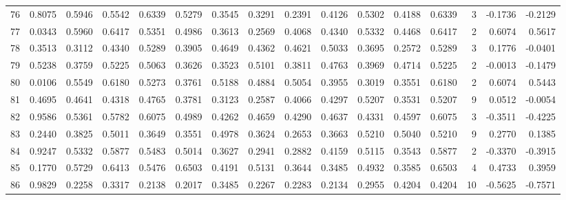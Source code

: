 \begin{tabular}{lrrrrrrrrrrrrrrr}
76  &      0.8075 &  0.5946 &  0.5542 &  0.6339 &  0.5279 &  0.3545 &  0.3291 &  0.2391 &  0.4126 &  0.5302 &   0.4188 &     0.6339 &      3 &                   -0.1736 &                    -0.2129 \\
77  &      0.0343 &  0.5960 &  0.6417 &  0.5351 &  0.4986 &  0.3613 &  0.2569 &  0.4068 &  0.4340 &  0.5332 &   0.4468 &     0.6417 &      2 &                    0.6074 &                     0.5617 \\
78  &      0.3513 &  0.3112 &  0.4340 &  0.5289 &  0.3905 &  0.4649 &  0.4362 &  0.4621 &  0.5033 &  0.3695 &   0.2572 &     0.5289 &      3 &                    0.1776 &                    -0.0401 \\
79  &      0.5238 &  0.3759 &  0.5225 &  0.5063 &  0.3626 &  0.3523 &  0.5101 &  0.3811 &  0.4763 &  0.3969 &   0.4714 &     0.5225 &      2 &                   -0.0013 &                    -0.1479 \\
80  &      0.0106 &  0.5549 &  0.6180 &  0.5273 &  0.3761 &  0.5188 &  0.4884 &  0.5054 &  0.3955 &  0.3019 &   0.3551 &     0.6180 &      2 &                    0.6074 &                     0.5443 \\
81  &      0.4695 &  0.4641 &  0.4318 &  0.4765 &  0.3781 &  0.3123 &  0.2587 &  0.4066 &  0.4297 &  0.5207 &   0.3531 &     0.5207 &      9 &                    0.0512 &                    -0.0054 \\
82  &      0.9586 &  0.5361 &  0.5782 &  0.6075 &  0.4989 &  0.4262 &  0.4659 &  0.4290 &  0.4637 &  0.4331 &   0.4597 &     0.6075 &      3 &                   -0.3511 &                    -0.4225 \\
83  &      0.2440 &  0.3825 &  0.5011 &  0.3649 &  0.3551 &  0.4978 &  0.3624 &  0.2653 &  0.3663 &  0.5210 &   0.5040 &     0.5210 &      9 &                    0.2770 &                     0.1385 \\
84  &      0.9247 &  0.5332 &  0.5877 &  0.5483 &  0.5014 &  0.3627 &  0.2941 &  0.2882 &  0.4159 &  0.5115 &   0.3543 &     0.5877 &      2 &                   -0.3370 &                    -0.3915 \\
85  &      0.1770 &  0.5729 &  0.6413 &  0.5476 &  0.6503 &  0.4191 &  0.5131 &  0.3644 &  0.3485 &  0.4932 &   0.3585 &     0.6503 &      4 &                    0.4733 &                     0.3959 \\
86  &      0.9829 &  0.2258 &  0.3317 &  0.2138 &  0.2017 &  0.3485 &  0.2267 &  0.2283 &  0.2134 &  0.2955 &   0.4204 &     0.4204 &     10 &                   -0.5625 &                    -0.7571 \\

\end{tabular}
